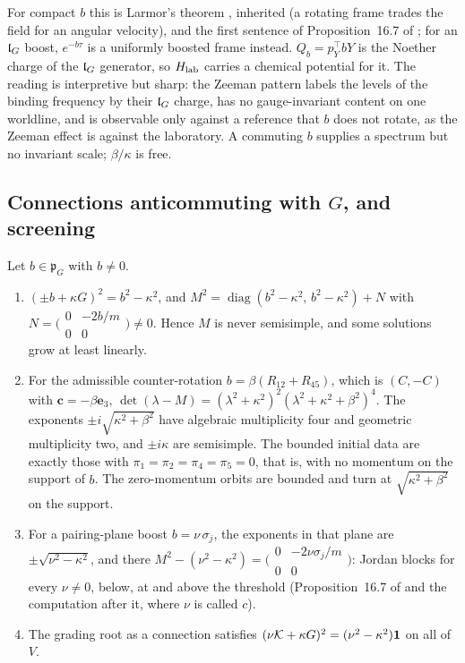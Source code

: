 For compact $b$ this is Larmor's theorem \cite{Larmor1897}, inherited (a rotating frame trades the field for an angular velocity), and the
first sentence of Proposition~16.7 of \cite{ES17}; for an $\mathfrak l_G$ boost, $e^{-b\tau}$ is a uniformly boosted frame instead. $Q_b=p_Y^{\!\top}bY$ is
the Noether charge of the $\mathfrak l_G$ generator, so $H_{\rm lab}$ carries a chemical potential for it. The reading is interpretive but sharp: the
Zeeman pattern labels the levels of the binding frequency by their $\mathfrak l_G$ charge, has no gauge-invariant content on one worldline, and is
observable only against a reference that $b$ does not rotate, as the Zeeman effect is against the laboratory. A commuting $b$ supplies a
spectrum but no invariant scale; $\beta/\kappa$ is free.

\subsection{\texorpdfstring{Connections anticommuting with $G$, and screening}{Connections anticommuting with G, and screening}}
\label{d4:sec:pG}

\begin{theorem}
\label{d4:thm:pG}
Let $b\in\mathfrak p_G$ with $b\neq0$.
\begin{enumerate}[label=(\roman*),leftmargin=2.2em]
\item $(\pm b+\kappa G)^2=b^2-\kappa^2$, and
$M^2=\operatorname{diag}(b^2-\kappa^2,\,b^2-\kappa^2)+N$ with $N=\bigl(\begin{smallmatrix}0&-2b/m\\0&0\end{smallmatrix}\bigr)\neq0$. Hence $M$ is never
semisimple, and some solutions grow at least linearly.
\item For the admissible counter-rotation $b=\beta(R_{12}+R_{45})$, which is $(C,-C)$ with $\mathbf c=-\beta\mathbf e_3$,
$\det(\lambda-M)=(\lambda^2+\kappa^2)^2(\lambda^2+\kappa^2+\beta^2)^4$. The exponents $\pm i\sqrt{\kappa^2+\beta^2}$ have algebraic multiplicity four and
geometric multiplicity two, and $\pm i\kappa$ are semisimple. The bounded initial data are exactly those with $\pi_1=\pi_2=\pi_4=\pi_5=0$, that is,
with no momentum on the support of $b$. The zero-momentum orbits are bounded and turn at $\sqrt{\kappa^2+\beta^2}$ on the support.
\item For a pairing-plane boost $b=\nu\,\sigma_j$, the exponents in that plane are $\pm\sqrt{\nu^2-\kappa^2}$, and there
$M^2-(\nu^2-\kappa^2)=\bigl(\begin{smallmatrix}0&-2\nu\sigma_j/m\\0&0\end{smallmatrix}\bigr)$: Jordan blocks for every $\nu\neq0$, below, at and above the
threshold (Proposition~16.7 of \cite{ES17} and the computation after it, where $\nu$ is called $c$).
\item The grading root as a connection satisfies $(\nu\mathcal K+\kappa G)^2=(\nu^2-\kappa^2)\mathbf 1$ on all of $V$.
\end{enumerate}
\end{theorem}

